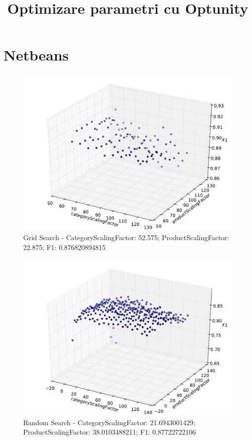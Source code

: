\documentclass{article}
\begin{document}
\title{Optimizare parametri cu Optunity}
\maketitle

\section{Netbeans}

\begin{figure}[!htb]
\centering
\includegraphics[width=\textwidth]{netbeans/g_netbeans.pdf}
\caption{Grid Search - CategoryScalingFactor: 52.575; ProductScalingFactor: 22.875; F1: 0.876820894815 }
\label{fig:NGrid-Search}
\end{figure}

\begin{figure}[!htb]
\centering
\includegraphics[width=\textwidth]{netbeans/rnd_netbeans.pdf}
\caption{Random Search - CategoryScalingFactor: 21.6943001429; ProductScalingFactor: 38.0103488211; F1: 0.87722722106 }
\label{fig:NRandom-Search}
\end{figure}
\end{document}
